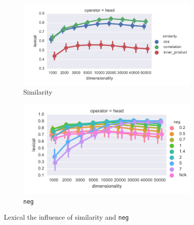 \begin{figure}[b]
  \centering

  \begin{subfigure}[t]{0.49\textwidth}
    \hspace{-20pt}
    \includegraphics[width=1.1\textwidth]{supplement/figures/lexical-interaction-similarity}

    \caption{Similarity}
    \label{fig:lexical-similarity}
  \end{subfigure}
  \begin{subfigure}[t]{0.49\textwidth}
    \includegraphics[width=\textwidth]{supplement/figures/lexical-interaction-neg}

    \caption{\texttt{neg}}
    \label{fig:lexical-neg}
  \end{subfigure}
  \caption{Lexical the influence of similarity and \texttt{neg}}
\end{figure}
